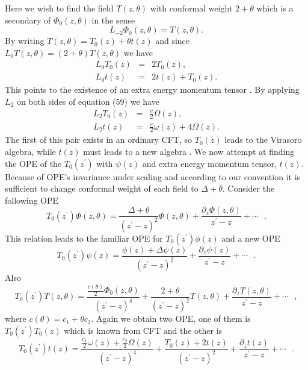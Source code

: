 \documentclass[a4paper,11pt]{article}
\begin{document}
Here we wish to find the field $T(z,\theta)$ with conformal weight
$2+\theta$ which is a secondary of $\Phi_{0}(z,\theta)$ in the
sense
\begin{equation}\label{eq:a59}
L_{-2}\Phi_{0}(z,\theta)=T(z,\theta) .
\end{equation}
By writing $T(z,\theta)=T_{0}(z)+\theta t(z)$ and since
$L_{0}T(z,\theta)=(2+\theta)T(z,\theta)$ we have
\begin{eqnarray}\label{eq:a60}
L_{0}T_{0}(z)&=&2T_{0}(z) ,\nonumber\\
L_{0}t(z)&=&2t(z)+T_{0}(z) .
\end{eqnarray}
This points to the existence of an extra energy momentum tensor
\cite{kogan,caux,lud}. By applying $L_{2}$ on both sides of
equation (59) we have
\begin{eqnarray}\label{eq:a61}
L_{2}T_{0}(z)&=&\frac{c}{2}\Omega(z) ,\nonumber\\
L_{2}t(z)&=&\frac{c}{2}\omega(z)+4\Omega(z) .
\end{eqnarray}
The first of this pair exists in an ordinary CFT, so $T_{0}(z)$
leads to the Virasoro algebra, while $t(z)$ must leads to a new
algebra \cite{lud}. We now attempt at finding the OPE of the
$T_{0}(z^{\prime})$ with $\psi(z)$ and extra energy momentum
tensor, $t(z)$. Because of OPE's invariance under scaling and
according to our convention it is sufficient to change conformal
weight of each field to $\Delta+\theta$. Consider the following
OPE
\begin{equation}\label{eq:a62}
T_{0}(z^{\prime})\Phi(z,\theta)=\frac{\Delta+\theta}{(z^{\prime}-z)^{2}}\Phi(z,\theta)+
\frac{\partial_{z}\Phi(z,\theta)}{z^{\prime}-z}+\cdots\:\:\:.
\end{equation}
This relation leads to the familiar OPE for
$T_{0}(z^{\prime})\phi(z)$ and a new OPE
\begin{equation}\label{eq:a63}
T_{0}(z^{\prime})\psi(z)=\frac{\phi(z)+\Delta\psi(z)}{(z^{\prime}-z)^{2}}+
\frac{\partial_{z}\psi(z)}{z^{\prime}-z}+\cdots\:\:\:.
\end{equation}
Also
\begin{equation}\label{eq:a64}
T_{0}(z^{\prime})T(z,\theta)=\frac{\frac{c(\theta)}{2}\Phi_{0}(z,\theta)}{(z^{\prime}-z)^{4}}
+\frac{2+\theta}{(z^{\prime}-z)^{2}}T(z,\theta)+\frac{\partial_{z}T(z,\theta)}{z^{\prime}-z}+\cdots\:\:\:,
\end{equation}
where $c(\theta)=c_{1}+\theta c_{2}$. Again we obtain two OPE, one
of them is $T_{0}(z^{\prime})T_{0}(z)$ which is known from CFT and
the other is
\begin{equation}\label{eq:a65}
T_{0}(z^{\prime})t(z)=\frac{\frac{c_1}{2}\omega(z)+\frac{c_2}{2}\Omega(z)}{(z^{\prime}-z)^{4}}
+\frac{T_{0}(z)+2t(z)}{(z^{\prime}-z)^{2}}+\frac{\partial_{z}t(z)}{z^{\prime}-z}+\cdots\:\:\:.
\end{equation}
\end{document}
